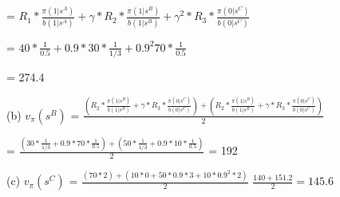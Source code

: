 \documentclass[12pt]{letter}
\begin{document}
= $R_1 * \frac{\pi(1|s^A)}{b(1|s^A)} + \gamma * R_2 * \frac{\pi(1|s^B)}{b(1|s^B)} + \gamma^2 * R_3 * \frac{\pi(0|s^C)}{b(0|s^C)}$

= $40 * \frac{1}{0.5} + 0.9 * 30 * \frac{1}{1/3} + 0.9^2 70 * \frac{1}{0.5}$

= 274.4

(b)
$v_\pi(s^B)$ = $\frac{(R_2 * \frac{\pi(1|s^B)}{b(1|s^B)} + \gamma * R_3 * \frac{\pi(0|s^C)}{b(0|s^C)}) + (R_2 * \frac{\pi(1|s^B)}{b(1|s^B)} + \gamma * R_3 * \frac{\pi(0|s^C)}{b(0|s^C)})}{2}$

= $\frac{(30 * \frac{1}{1/3} + 0.9 * 70 * \frac{1}{0.5}) + (50 * \frac{1}{1/3} + 0.9 * 10 * \frac{1}{0.5})}{2}$
= 192

(c)
$v_\pi(s^C)$ = $\frac{(70 * 2) + (10*0 + 50 * 0.9 * 3 + 10 * 0.9^2 * 2)}{2}$
$\frac{140 + 151.2}{2} = 145.6$
\end{document}
